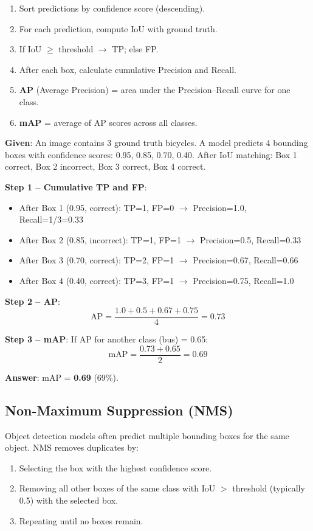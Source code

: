 \documentclass[11pt,a4paper]{article}
\begin{document}
\begin{enumerate}
    \item Sort predictions by confidence score (descending).
    \item For each prediction, compute IoU with ground truth.
    \item If IoU $\geq$ threshold $\to$ TP; else FP.
    \item After each box, calculate cumulative Precision and Recall.
    \item \textbf{AP} (Average Precision) = area under the Precision--Recall curve for one class.
    \item \textbf{mAP} = average of AP scores across all classes.
\end{enumerate}

\begin{tcolorbox}[colback=yellow!5!white,colframe=yellow!75!black,title=\textbf{Worked Example 10: IoU, Precision, Recall, and mAP}]
\textbf{Given}: An image contains 3 ground truth bicycles. A model predicts 4 bounding boxes with confidence scores: 0.95, 0.85, 0.70, 0.40. After IoU matching: Box 1 correct, Box 2 incorrect, Box 3 correct, Box 4 correct.

\textbf{Step 1 -- Cumulative TP and FP}:
\begin{itemize}
    \item After Box 1 (0.95, correct): TP=1, FP=0 $\to$ Precision=1.0, Recall=1/3=0.33
    \item After Box 2 (0.85, incorrect): TP=1, FP=1 $\to$ Precision=0.5, Recall=0.33
    \item After Box 3 (0.70, correct): TP=2, FP=1 $\to$ Precision=0.67, Recall=0.66
    \item After Box 4 (0.40, correct): TP=3, FP=1 $\to$ Precision=0.75, Recall=1.0
\end{itemize}

\textbf{Step 2 -- AP}:
\[
\text{AP} = \frac{1.0 + 0.5 + 0.67 + 0.75}{4} = 0.73
\]

\textbf{Step 3 -- mAP}: If AP for another class (bus) = 0.65:
\[
\text{mAP} = \frac{0.73 + 0.65}{2} = 0.69
\]

\textbf{Answer}: mAP = \textbf{0.69} (69\%).
\end{tcolorbox}

\subsection{Non-Maximum Suppression (NMS)}

Object detection models often predict multiple bounding boxes for the same object. NMS removes duplicates by:
\begin{enumerate}
    \item Selecting the box with the highest confidence score.
    \item Removing all other boxes of the same class with IoU $>$ threshold (typically 0.5) with the selected box.
    \item Repeating until no boxes remain.
\end{enumerate}
\end{document}
